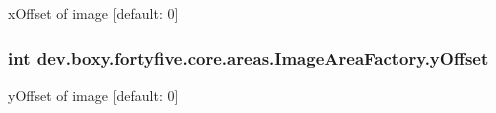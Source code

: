 \label{d5/d15/group___image_area_ga8f5f4265e2db6213e49b143287bdb5d9}
xOffset of image \mbox{[}default: 0\mbox{]} \hypertarget{group___image_area_ga7741b37a22cdb63f6448186c06f61d05}{
\subsubsection[{yOffset}]{\setlength{\rightskip}{0pt plus 5cm}int {\bf dev.boxy.fortyfive.core.areas.ImageAreaFactory.yOffset}}}
\label{d5/d15/group___image_area_ga7741b37a22cdb63f6448186c06f61d05}
yOffset of image \mbox{[}default: 0\mbox{]} 
